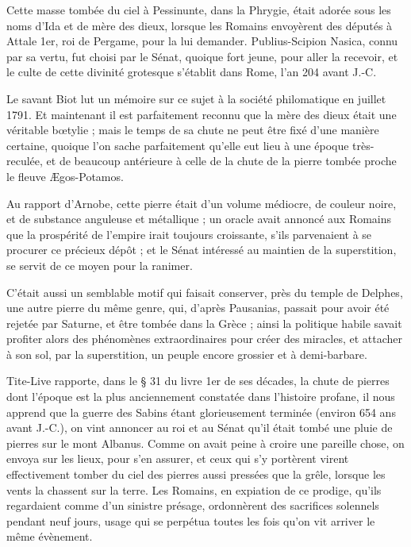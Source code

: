 \documentclass[a4paper, 12pt, oneside, french]{article}
\begin{document}
Cette masse tombée du ciel à Pessinunte, dans la Phrygie, était adorée sous les noms d'Ida et de mère des dieux, lorsque les Romains envoyèrent des députés à Attale 1er, roi de Pergame, pour la lui demander. Publius-Scipion Nasica, connu par sa vertu, fut choisi par le Sénat, quoique fort jeune, pour aller la recevoir, et le culte de cette divinité grotesque s'établit dans Rome, l'an 204 avant J.-C.

Le savant Biot lut un mémoire sur ce sujet à la société philomatique en juillet 1791. Et maintenant il est parfaitement reconnu que la mère des dieux était une véritable bœtylie ; mais le temps de sa chute ne peut être fixé d'une manière certaine, quoique l'on sache parfaitement qu'elle eut lieu à une époque très-reculée, et de beaucoup antérieure à celle de la chute de la pierre tombée proche le fleuve Ægos-Potamos.

Au rapport d'Arnobe, cette pierre était d'un volume médiocre, de couleur noire, et de substance anguleuse et métallique ; un oracle avait annoncé aux Romains que la prospérité de l'empire irait toujours croissante, s'ils parvenaient à se procurer ce précieux dépôt ; et le Sénat intéressé au maintien de la superstition, se servit de ce moyen pour la ranimer.

C'était aussi un semblable motif qui faisait conserver, près du temple de Delphes, une autre pierre du même genre, qui, d'après Pausanias, passait pour avoir été rejetée par Saturne, et être tombée dans la Grèce ; ainsi la politique habile savait profiter alors des phénomènes extraordinaires pour créer des miracles, et attacher à son sol, par la superstition, un peuple encore grossier et à demi-barbare.

Tite-Live rapporte, dans le § 31 du livre 1er de ses décades, la chute de pierres dont l'époque est la plus anciennement constatée dans l'histoire profane, il nous apprend que la guerre des Sabins étant glorieusement terminée (environ 654 ans avant J.-C.), on vint annoncer au roi et au Sénat qu'il était tombé une pluie de pierres sur le mont Albanus. Comme on avait peine à croire une pareille chose, on envoya sur les lieux, pour s'en assurer, et ceux qui s'y portèrent virent effectivement tomber du ciel des pierres aussi pressées que la grêle, lorsque les vents la chassent sur la terre. Les Romains, en expiation de ce prodige, qu'ils regardaient comme d'un sinistre présage, ordonnèrent des sacrifices solennels pendant neuf jours, usage qui se perpétua toutes les fois qu'on vit arriver le même évènement.
\end{document}
